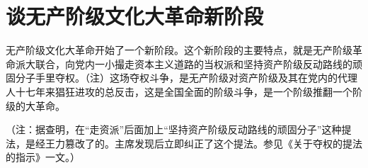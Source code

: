 \section[谈无产阶级文化大革命新阶段（一九六七年一月二十三日）]{谈无产阶级文化大革命新阶段}


无产阶级文化大革命开始了一个新阶段。这个新阶段的主要特点，就是无产阶级革命派大联合，向党内一小撮走资本主义道路的当权派和坚持资产阶级反动路线的顽固分子手里夺权。（注）这场夺权斗争，是无产阶级对资产阶级及其在党内的代理人十七年来猖狂进攻的总反击，这是全国全面的阶级斗争，是一个阶级推翻一个阶级的大革命。


（注：据查明，在“走资派”后面加上“坚持资产阶级反动路线的顽固分子”这种提法，是经王力篡改了的。主席发现后立即纠正了这个提法。参见《关于夺权的提法的指示》一文。）


